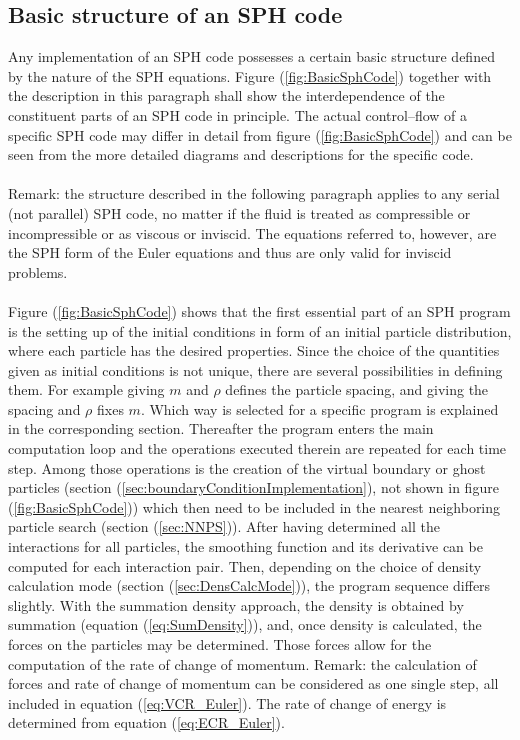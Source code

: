 \documentclass{report}
\begin{document}
\subsection{Basic structure of an SPH code}

Any implementation of an SPH code possesses a certain basic structure defined by the nature of the SPH equations. Figure (\ref{fig:BasicSphCode}) together with the description in this paragraph shall show the interdependence of the constituent parts of an SPH code in principle. The actual control--flow of a specific SPH code may differ in detail from figure (\ref{fig:BasicSphCode}) and can be seen from the more detailed diagrams and descriptions for the specific code.\\
\\
\indent
Remark: the structure described in the following paragraph applies to any serial (not parallel) SPH code, no matter if the fluid is treated as compressible or incompressible or as viscous or inviscid. The equations referred to, however, are the SPH form of the Euler equations and thus are only valid for inviscid problems.\\
\\
\indent
Figure (\ref{fig:BasicSphCode}) shows that the first essential part of an SPH program is the setting up of the initial conditions in form of an initial particle distribution, where each particle has the desired properties.
Since the choice of the quantities given as initial conditions is not unique, there are several possibilities in defining them. For example giving $m$ and $\rho$ defines the particle spacing, and giving the spacing and $\rho$ fixes $m$. Which way is selected for a specific program is explained in the corresponding section. Thereafter the program enters the main computation loop and the operations executed therein are repeated for each time step. Among those operations is the creation of the virtual boundary or ghost particles (section (\ref{sec:boundaryConditionImplementation}), not shown in figure (\ref{fig:BasicSphCode})) which then need to be included in the nearest neighboring particle search (section (\ref{sec:NNPS})). After having determined all the interactions for all particles, the smoothing function and its derivative can be computed for each interaction pair. Then, depending on the 
choice of density calculation mode (section (\ref{sec:DensCalcMode})), the program sequence differs slightly. With the summation density approach, the density is obtained by summation (equation (\ref{eq:SumDensity})), and, once density is calculated, the forces on the particles may be determined. Those forces allow for the computation of the rate of change of momentum. Remark: the calculation of forces and rate of change of momentum can be considered as one single step, all included in equation (\ref{eq:VCR_Euler}). The rate of change of energy is determined from equation (\ref{eq:ECR_Euler}).
\end{document}
